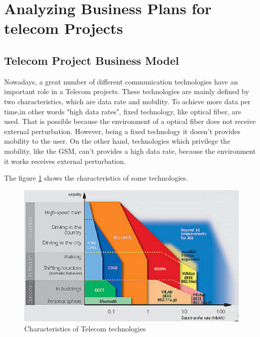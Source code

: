 \documentclass[a4paper,11pt]{article}
\begin{document}
\titleTMB 
\newpage

\pagestyle{fancy}

\section{Analyzing Business Plans for telecom Projects}
\subsection{Telecom Project Business Model}

Nowadays, a great  number of different communication technologies have an important role in a Telecom projects. These technologies are mainly defined by two characteristics, which are data rate and mobility.
To achieve more data per time,in other words "high data rates", fixed technology, like optical  fiber, are used. That is possible because the environment of a optical fiber does not receive external perturbation. However, being a fixed technology it doesn't provides mobility to the user.
On the other hand, technologies which  privilege the mobility, like the GSM,  can't provides  a high data rate, because the environment it works receives external perturbation.

The figure \ref{fig:tel_tech} shows the characteristics of some technologies.

\begin{figure}[h!]
\begin{centering}
\includegraphics[scale=0.8]{szenbild_1224832}
\par\end{centering}
\caption{Characteristics of Telecom technologies \protect\footnotemark}
\label{fig:tel_tech}
\end{figure}
\end{document}
